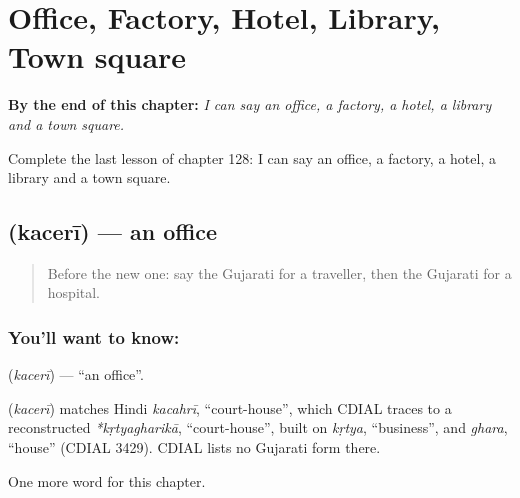 
\chapter{Office, Factory, Hotel, Library, Town square}
\label{ch:gu-office-factory-hotel-library-town-square}

\begin{chapteropening}
\textbf{By the end of this chapter:} \emph{I can say an office, a factory, a hotel, a library and a town square.}

Complete the last lesson of chapter 128: I can say an office, a factory, a hotel, a library and a town square.
\end{chapteropening}

\section[\texorpdfstring{\gu{કચેરી} (kacerī)}{કચેરી (kacerī)}]{ (kacerī) — an office}

\label{lesson:GU-C128-kaceri}



\begin{quote}
Before the new one: say the Gujarati for a traveller, then the Gujarati for a hospital.
\end{quote}

\subsection*{You'll want to know: }
\textbf{} (\emph{kacerī}) — \textquotedblleft{}an office\textquotedblright{}.

\begin{cousinweb}
\textbf{} (\emph{kacerī}) matches Hindi \emph{kacahrī}, \textquotedblleft{}court-house\textquotedblright{}, which CDIAL traces to a reconstructed \emph{*kṛtyagharikā}, \textquotedblleft{}court-house\textquotedblright{}, built on \emph{kṛtya}, \textquotedblleft{}business\textquotedblright{}, and \emph{ghara}, \textquotedblleft{}house\textquotedblright{} (CDIAL 3429). CDIAL lists no Gujarati form there.
\end{cousinweb}

\begin{grammarlens}[title={What you've built}]
One more word for this chapter.
\end{grammarlens}

